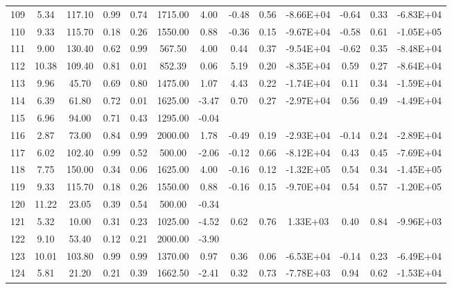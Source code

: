 \begin{landscape}
\begin{center}
\begin{longtable}{|c|c|c|c|c|c|c|c|c|c|c|c|c|}
109 & 5.34  & 117.10 & 0.99 & 0.74 & 1715.00 & 4.00  & -0.48 & 0.56 & -8.66E+04 & -0.64 & 0.33 & -6.83E+04 \\
110 & 9.33  & 115.70 & 0.18 & 0.26 & 1550.00 & 0.88  & -0.36 & 0.15 & -9.67E+04 & -0.58 & 0.61 & -1.05E+05 \\
111 & 9.00  & 130.40 & 0.62 & 0.99 & 567.50  & 4.00  & 0.44  & 0.37 & -9.54E+04 & -0.62 & 0.35 & -8.48E+04 \\
112 & 10.38 & 109.40 & 0.81 & 0.01 & 852.39  & 0.06  & 5.19  & 0.20 & -8.35E+04 & 0.59  & 0.27 & -8.64E+04 \\
113 & 9.96  & 45.70  & 0.69 & 0.80 & 1475.00 & 1.07  & 4.43  & 0.22 & -1.74E+04 & 0.11  & 0.34 & -1.59E+04 \\
114 & 6.39  & 61.80  & 0.72 & 0.01 & 1625.00 & -3.47 & 0.70  & 0.27 & -2.97E+04 & 0.56  & 0.49 & -4.49E+04 \\
115 & 6.96  & 94.00  & 0.71 & 0.43 & 1295.00 & -0.04 &       &      &           &       &      &           \\
116 & 2.87  & 73.00  & 0.84 & 0.99 & 2000.00 & 1.78  & -0.49 & 0.19 & -2.93E+04 & -0.14 & 0.24 & -2.89E+04 \\
117 & 6.02  & 102.40 & 0.99 & 0.52 & 500.00  & -2.06 & -0.12 & 0.66 & -8.12E+04 & 0.43  & 0.45 & -7.69E+04 \\
118 & 7.75  & 150.00 & 0.34 & 0.06 & 1625.00 & 4.00  & -0.16 & 0.12 & -1.32E+05 & 0.54  & 0.34 & -1.45E+05 \\
119 & 9.33  & 115.70 & 0.18 & 0.26 & 1550.00 & 0.88  & -0.16 & 0.15 & -9.70E+04 & 0.54  & 0.57 & -1.20E+05 \\
120 & 11.22 & 23.05  & 0.39 & 0.54 & 500.00  & -0.34 &       &      &           &       &      &           \\
121 & 5.32  & 10.00  & 0.31 & 0.23 & 1025.00 & -4.52 & 0.62  & 0.76 & 1.33E+03  & 0.40  & 0.84 & -9.96E+03 \\
122 & 9.10  & 53.40  & 0.12 & 0.21 & 2000.00 & -3.90 &       &      &           &       &      &           \\
123 & 10.01 & 103.80 & 0.99 & 0.99 & 1370.00 & 0.97  & 0.36  & 0.06 & -6.53E+04 & -0.14 & 0.23 & -6.49E+04 \\
124 & 5.81  & 21.20  & 0.21 & 0.39 & 1662.50 & -2.41 & 0.32  & 0.73 & -7.78E+03 & 0.94  & 0.62 & -1.53E+04 \\\bottomrule

\end{longtable}
\end{center}
\end{landscape}



